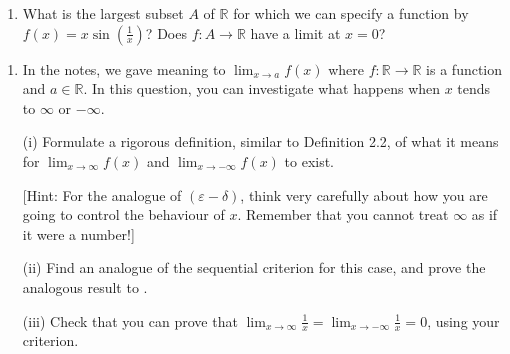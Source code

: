 \documentclass[letterpaper,10pt,english]{jupyterBook}
\begin{document}
\label{\detokenize{Problems:id10}}\begin{enumerate}
%
\setcounter{enumi}{9}
\item {} 
\sphinxAtStartPar
What is the largest subset \(A\) of \(\mathbb{R}\) for which we can specify a function by \(f(x) = x\sin\left(\frac{1}{x}\right)\)? Does \(f:A\to\mathbb{R}\)  have a limit at \(x = 0\)?

\end{enumerate}
\label{\detokenize{Problems:id11}}\begin{enumerate}
%
\setcounter{enumi}{10}
\item {} 
\sphinxAtStartPar
In the notes, we gave meaning to \(\displaystyle\lim_{x \rightarrow a} f(x)\) where \(f:\mathbb{R} \rightarrow \mathbb{R}\) is a function and \(a \in \mathbb{R}\). In this question, you can investigate what happens when \(x\) tends to \(\infty\) or \(-\infty\).

\sphinxAtStartPar
(i) Formulate a rigorous definition, similar to Definition 2.2, of what it means for \(\displaystyle\lim_{x \rightarrow \infty}f(x)\) and \(\displaystyle\lim_{x \rightarrow -\infty}f(x)\) to exist.

{[}Hint: For the analogue of \((\varepsilon-\delta)\), think very carefully about how you are going to control the behaviour of \(x\). Remember that you cannot treat \(\infty\) as if it were a number!{]}

\sphinxAtStartPar
(ii) Find an analogue of the sequential criterion for this case, and prove the analogous result to .

\sphinxAtStartPar
(iii) Check that you can prove that \(\displaystyle\lim_{x \rightarrow \infty}\frac{1}{x} = \lim_{x \rightarrow -\infty}\frac{1}{x} = 0\), using your criterion.

\end{enumerate}
\end{document}
